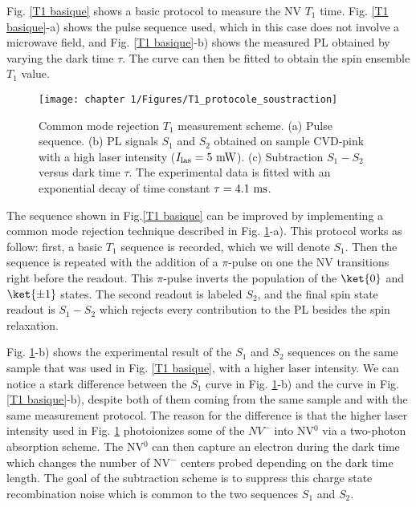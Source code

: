 \documentclass[a4paper, 11pt]{report}
\begin{document}
Fig. \ref{T1 basique} shows a basic protocol to measure the NV $T_1$ time. Fig. \ref{T1 basique}-a) shows the pulse sequence used, which in this case does not involve a microwave field, and Fig. \ref{T1 basique}-b) shows the measured PL obtained by varying the dark time $\tau$. The curve can then be fitted to obtain the spin ensemble $T_1$ value.

\begin{figure}[h!]
\centering
\texttt{[image: chapter 1/Figures/T1\_protocole\_soustraction]}
\caption{Common mode rejection $T_1$ measurement scheme. (a) Pulse sequence. (b) PL signals $S_1$ and $S_2$ obtained on sample CVD-pink with a high laser intensity ($I_{\rm las}=5\ \rm mW$). (c) Subtraction $S_1-S_2$ versus dark time $\tau$. The experimental data is fitted with an exponential decay of time constant $\tau=4.1\ \rm ms$.}
\label{T1 soustraction}
\end{figure}

The sequence shown in Fig.\ref{T1 basique} can be improved by implementing a common mode rejection technique described in Fig. \ref{T1 soustraction}-a). This protocol works as follow: first, a basic $T_1$ sequence is recorded, which we will denote $S_1$. Then the sequence is repeated with the addition of a $\pi$-pulse on one the NV transitions right before the readout. This $\pi$-pulse inverts the population of the $\ket{0}$ and $\ket{\pm 1}$ states. The second readout is labeled $S_2$, and the final spin state readout is $S_1 -S_2$ which rejects every contribution to the PL besides the spin relaxation. 

Fig. \ref{T1 soustraction}-b) shows the experimental result of the $S_1$ and $S_2$ sequences on the same sample that was used in Fig. \ref{T1 basique}, with a higher laser intensity. We can notice a stark difference between the $S_1$ curve in Fig. \ref{T1 soustraction}-b) and the curve in Fig. \ref{T1 basique}-b), despite both of them coming from the same sample and with the same measurement protocol. The reason for the difference is that the higher laser intensity used in Fig. \ref{T1 soustraction} photoionizes some of the $NV^-$ into NV$^0$ via a two-photon absorption scheme. The NV$^0$ can then capture an electron during the dark time \citep{giri2018coupled, giri2019selective} which changes the number of NV$^-$ centers probed depending on the dark time length. The goal of the subtraction scheme is to suppress this charge state recombination noise which is common to the two sequences $S_1$ and $S_2$.
\end{document}
